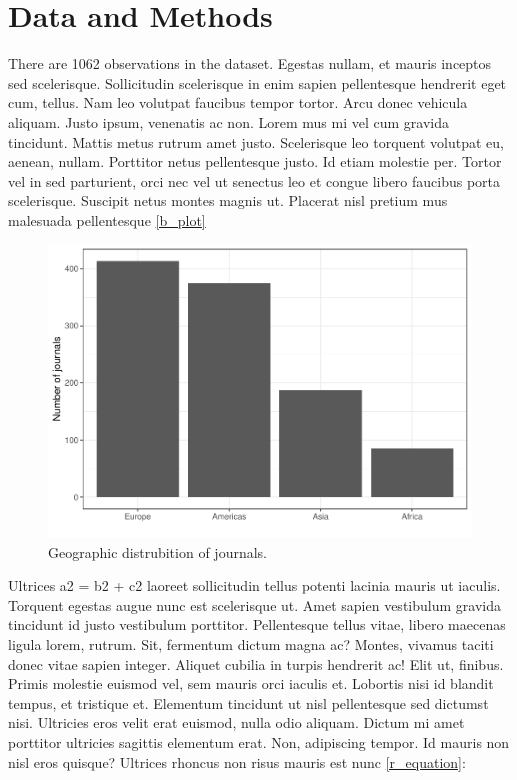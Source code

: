 \documentclass[
  12,
]{article}
\begin{document}
\hypertarget{data-and-methods}{%
\section{Data and Methods}\label{data-and-methods}}

There are 1062 observations in the dataset. Egestas nullam, et mauris
inceptos sed scelerisque. Sollicitudin scelerisque in enim sapien
pellentesque hendrerit eget cum, tellus. Nam leo volutpat faucibus
tempor tortor. Arcu donec vehicula aliquam. Justo ipsum, venenatis ac
non. Lorem mus mi vel cum gravida tincidunt. Mattis metus rutrum amet
justo. Scelerisque leo torquent volutpat eu, aenean, nullam. Porttitor
netus pellentesque justo. Id etiam molestie per. Tortor vel in sed
parturient, orci nec vel ut senectus leo et congue libero faucibus porta
scelerisque. Suscipit netus montes magnis ut. Placerat nisl pretium mus
malesuada pellentesque \autoref{b_plot}

\begin{figure}

{\centering \includegraphics[width=0.75\linewidth]{journals_files/figure-latex/barplot-1} 

}

\caption{Geographic distrubition of journals. \label{b_plot}}\label{fig:barplot}
\end{figure}

Ultrices a2 = b2 + c2 laoreet sollicitudin tellus potenti lacinia mauris
ut iaculis. Torquent egestas augue nunc est scelerisque ut. Amet sapien
vestibulum gravida tincidunt id justo vestibulum porttitor. Pellentesque
tellus vitae, libero maecenas ligula lorem, rutrum. Sit, fermentum
dictum magna ac? Montes, vivamus taciti donec vitae sapien integer.
Aliquet cubilia in turpis hendrerit ac! Elit ut, finibus. Primis
molestie euismod vel, sem mauris orci iaculis et. Lobortis nisi id
blandit tempus, et tristique et. Elementum tincidunt ut nisl
pellentesque sed dictumst nisi. Ultricies eros velit erat euismod, nulla
odio aliquam. Dictum mi amet porttitor ultricies sagittis elementum
erat. Non, adipiscing tempor. Id mauris non nisl eros quisque? Ultrices
rhoncus non risus mauris est nunc \autoref{r_equation}:
\end{document}

